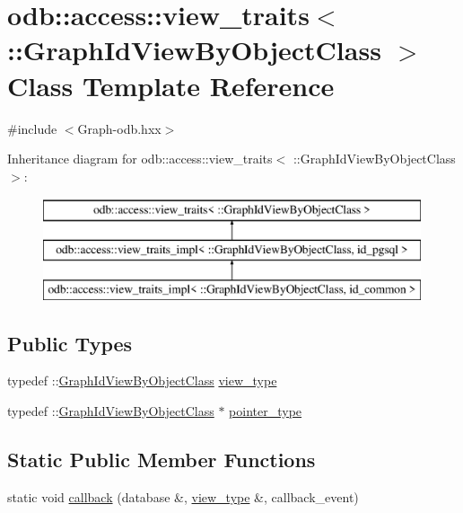 \hypertarget{classodb_1_1access_1_1view__traits_3_01_1_1_graph_id_view_by_object_class_01_4}{}\section{odb\+:\+:access\+:\+:view\+\_\+traits$<$ \+:\+:Graph\+Id\+View\+By\+Object\+Class $>$ Class Template Reference}
\label{classodb_1_1access_1_1view__traits_3_01_1_1_graph_id_view_by_object_class_01_4}


{\ttfamily \#include $<$Graph-\/odb.\+hxx$>$}

Inheritance diagram for odb\+:\+:access\+:\+:view\+\_\+traits$<$ \+:\+:Graph\+Id\+View\+By\+Object\+Class $>$\+:\begin{figure}[H]
\begin{center}
\leavevmode
\includegraphics[height=3.000000cm]{dc/dbc/classodb_1_1access_1_1view__traits_3_01_1_1_graph_id_view_by_object_class_01_4}
\end{center}
\end{figure}
\subsection*{Public Types}
\begin{DoxyCompactItemize}
\item 
typedef \+::\hyperlink{struct_graph_id_view_by_object_class}{Graph\+Id\+View\+By\+Object\+Class} \hyperlink{classodb_1_1access_1_1view__traits_3_01_1_1_graph_id_view_by_object_class_01_4_a66d9fb52e7d3f5dacaeb5ce514900eea}{view\+\_\+type}
\item 
typedef \+::\hyperlink{struct_graph_id_view_by_object_class}{Graph\+Id\+View\+By\+Object\+Class} $\ast$ \hyperlink{classodb_1_1access_1_1view__traits_3_01_1_1_graph_id_view_by_object_class_01_4_aea2ca04f6ba0d65ba4160f5acd1db898}{pointer\+\_\+type}
\end{DoxyCompactItemize}
\subsection*{Static Public Member Functions}
\begin{DoxyCompactItemize}
\item 
static void \hyperlink{classodb_1_1access_1_1view__traits_3_01_1_1_graph_id_view_by_object_class_01_4_a17171979b188336ca44f774423340a34}{callback} (database \&, \hyperlink{classodb_1_1access_1_1view__traits_3_01_1_1_graph_id_view_by_object_class_01_4_a66d9fb52e7d3f5dacaeb5ce514900eea}{view\+\_\+type} \&, callback\+\_\+event)
\end{DoxyCompactItemize}


